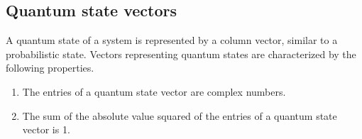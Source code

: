 \documentclass[12pt]{article} %
\begin{document}
\subsection{Quantum state vectors}
A quantum state of a system is represented by a column vector, similar to a probabilistic state. Vectors representing quantum states are characterized by the following properties.
\begin{enumerate}
  \item The entries of a quantum state vector are complex numbers.
  \item The sum of the absolute value squared of the entries of a quantum state vector is 1.
\end{enumerate}
\end{document}
